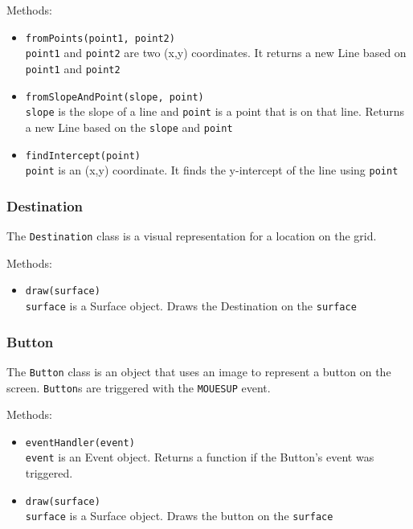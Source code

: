 \documentclass[12pt,letterpaper]{article}
\begin{document}
        \noindent Methods:
        \begin{itemize}
            \item \texttt{fromPoints(point1, point2)} \\
                \texttt{point1} and \texttt{point2} are two (x,y) coordinates. It returns a new Line based on \texttt{point1} and \texttt{point2}
            \item \texttt{fromSlopeAndPoint(slope, point)} \\
                \texttt{slope} is the slope of a line and \texttt{point} is a point that is on that line. Returns a new Line based on the \texttt{slope} and \texttt{point}
            \item \texttt{findIntercept(point)} \\
                \texttt{point} is an (x,y) coordinate. It finds the y-intercept of the line using \texttt{point}
        \end{itemize}
        
    \subsubsection{Destination}
        The \texttt{Destination} class is a visual representation for a location on the grid.
                
        \noindent Methods:
        \begin{itemize}
            \item \texttt{draw(surface)} \\
                \texttt{surface} is a Surface object. Draws the Destination on the \texttt{surface}
        \end{itemize}

    \subsubsection{Button}
        The \texttt{Button} class is an object that uses an image to represent a button on the screen. \texttt{Button}s are triggered with the \texttt{MOUESUP} event.
        
        \noindent Methods:
        \begin{itemize}
            \item \texttt{eventHandler(event)} \\
                \texttt{event} is an Event object. Returns a function if the Button's event was triggered.
            \item \texttt{draw(surface)} \\
                \texttt{surface} is a Surface object. Draws the button on the \texttt{surface}
        \end{itemize}
        
\end{document}
